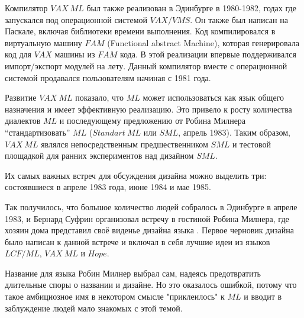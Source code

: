 \documentclass[14pt]{matmex-diploma-custom}
\begin{document}
Компилятор $V\!AX\ ML$ был также реализован в Эдинбурге в 1980-1982, годах где запускался под операционной системой $V\!AX/V\!MS$. Он также был написан на Паскале, включая библиотеки времени выполнения. Код компилировался в  виртуальную машину $FAM$ (Functional abstract Machine), которая генерировала код для $V\!AX$ машины из $F\!AM$ кода. В этой реализации впервые поддерживался импорт/экспорт модулей на лету. Данный компилятор вместе с операционной системой продавался пользователям начиная с 1981 года.

Развитие $V\!AX\ ML$ показало, что $M\!L$ может использоваться как язык общего назначения и имеет эффективную реализацию. Это привело к росту количества диалектов $M\!L$ и последующему предложению от Робина Милнера “стандартизовать” $M\!L$ ($Standart\ M\!L$ или $SM\!L$, апрель 1983). Таким образом,  $V\!AX\ M\!L$ являлся непосредственным предшественником $SM\!L$ и тестовой площадкой для ранних экспериментов над дизайном $SM\!L$.

Их самых важных встреч для обсуждения дизайна можно выделить три: состоявшиеся в апреле 1983 года, июне 1984 и мае 1985. 

Так получилось, что большое количество людей собралось в Эдинбурге в апреле 1983, и Бернард Суфрин организовал встречу в гостиной Робина Милнера, где хозяин дома представил своё виденье дизайна языка \cite{milner2}. Первое черновик дизайна было написан к данной встрече и включал в себя лучшие идеи из языков $LCF/M\!L$, $V\!AX\ M\!L$ и $Hope$. 


Название для языка Робин Милнер выбрал сам, надеясь предотвратить длительные споры о названии и дизайне. Но это оказалось ошибкой, потому что такое амбициозное имя в некотором смысле "приклеилось" к $M\!L$ и вводит в заблуждение людей мало знакомых с этой темой.
\end{document}
